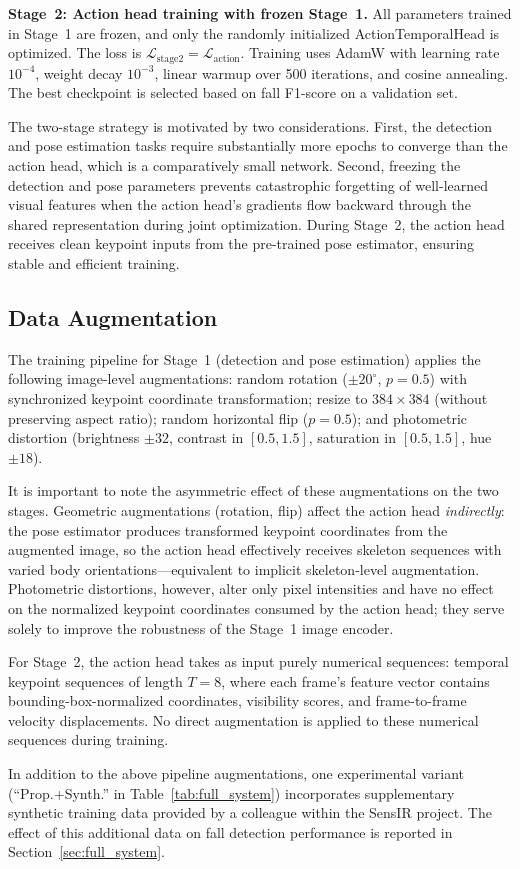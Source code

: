 \textbf{Stage~2: Action head training with frozen Stage~1.} All parameters trained in Stage~1 are frozen, and only the randomly initialized ActionTemporalHead is optimized. The loss is $\mathcal{L}_\text{stage2} = \mathcal{L}_\text{action}$. Training uses AdamW with learning rate $10^{-4}$, weight decay $10^{-3}$, linear warmup over 500 iterations, and cosine annealing. The best checkpoint is selected based on fall F1-score on a validation set.

The two-stage strategy is motivated by two considerations. First, the detection and pose estimation tasks require substantially more epochs to converge than the action head, which is a comparatively small network. Second, freezing the detection and pose parameters prevents catastrophic forgetting of well-learned visual features when the action head's gradients flow backward through the shared representation during joint optimization. During Stage~2, the action head receives clean keypoint inputs from the pre-trained pose estimator, ensuring stable and efficient training.

\subsection{Data Augmentation}
\label{subsec:augmentation}

The training pipeline for Stage~1 (detection and pose estimation) applies the following image-level augmentations: random rotation ($\pm 20^\circ$, $p = 0.5$) with synchronized keypoint coordinate transformation; resize to $384 \times 384$ (without preserving aspect ratio); random horizontal flip ($p = 0.5$); and photometric distortion (brightness $\pm 32$, contrast in $[0.5, 1.5]$, saturation in $[0.5, 1.5]$, hue $\pm 18$).

It is important to note the asymmetric effect of these augmentations on the two stages. Geometric augmentations (rotation, flip) affect the action head \emph{indirectly}: the pose estimator produces transformed keypoint coordinates from the augmented image, so the action head effectively receives skeleton sequences with varied body orientations---equivalent to implicit skeleton-level augmentation. Photometric distortions, however, alter only pixel intensities and have no effect on the normalized keypoint coordinates consumed by the action head; they serve solely to improve the robustness of the Stage~1 image encoder.

For Stage~2, the action head takes as input purely numerical sequences: temporal keypoint sequences of length $T = 8$, where each frame's feature vector contains bounding-box-normalized coordinates, visibility scores, and frame-to-frame velocity displacements. No direct augmentation is applied to these numerical sequences during training.

In addition to the above pipeline augmentations, one experimental variant (``Prop.+Synth.'' in Table~\ref{tab:full_system}) incorporates supplementary synthetic training data provided by a colleague within the SensIR project. The effect of this additional data on fall detection performance is reported in Section~\ref{sec:full_system}.

